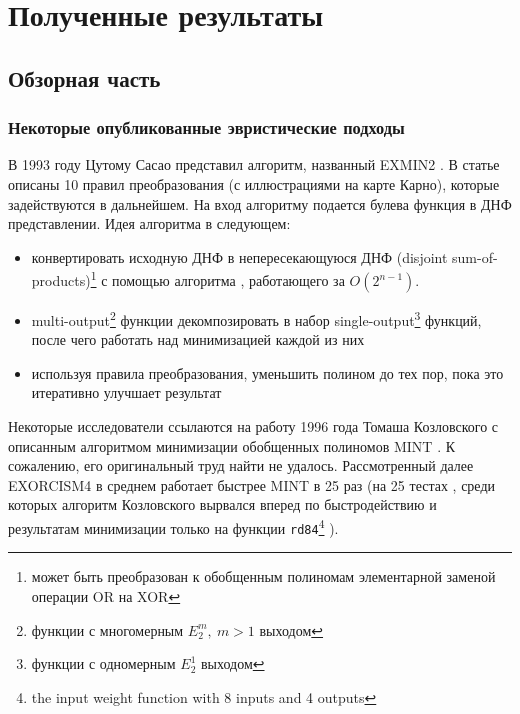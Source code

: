 \documentclass[a4paper,12pt,titlepage,finall]{article}
\begin{document}
\newpage

\section{Полученные результаты}

\subsection{Обзорная часть}

\subsubsection{Некоторые опубликованные эвристические подходы}

В 1993 году Цутому Сасао представил алгоритм, названный \textsc{EXMIN2} \cite{exmin2}.
В статье описаны 10 правил преобразования (с иллюстрациями на карте Карно), которые задействуются в дальнейшем. На вход алгоритму подается булева функция в ДНФ представлении. Идея алгоритма в следующем:
\begin{itemize}
    \item конвертировать исходную ДНФ в непересекающуюся ДНФ (disjoint sum-of-products)\footnote{может быть преобразован к обобщенным полиномам элементарной заменой операции \textsc{OR} на \textsc{XOR}} с помощью алгоритма \cite{sop2dsop}, работающего за $ O \left( 2^{n - 1} \right) $.
    \item multi-output\footnote{функции с многомерным $ E_2^m,\ m > 1 $ выходом} функции декомпозировать в набор single-output\footnote{функции с одномерным $ E_2^1 $ выходом} функций, после чего работать над минимизацией каждой из них
    \item используя правила преобразования, уменьшить полином до тех пор, пока это итеративно улучшает результат
\end{itemize}

Некоторые исследователи ссылаются на работу 1996 года Томаша Козловского с описанным алгоритмом минимизации обобщенных полиномов \textsc{MINT} \cite{mint}. К сожалению, его оригинальный труд найти не удалось. Рассмотренный далее \textsc{EXORCISM4} в среднем работает быстрее \textsc{MINT} в 25 раз (на 25 тестах \cite{exorcism4}, среди которых алгоритм Козловского вырвался вперед по быстродействию и результатам минимизации только на функции \texttt{rd84}\footnote{the input weight function with 8 inputs and 4 outputs} \cite{benchmark}).
\end{document}
